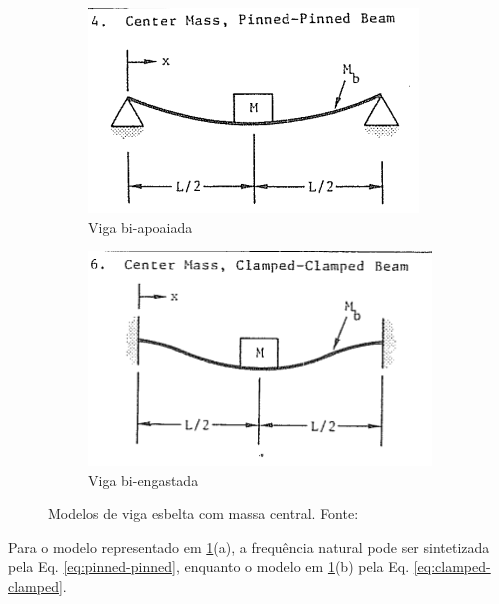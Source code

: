 \begin{figure}[h]
    \centering
    \begin{subfigure}{0.45\textwidth}
         \includegraphics[width=\textwidth]{images/frequencia/center-mass-pinned-pinned.png}
         \caption{Viga bi-apoaiada}
    \end{subfigure}
    \begin{subfigure}{0.45\textwidth}
         \includegraphics[width=\textwidth]{images/frequencia/center-mass-clamped-clamped.png}
         \caption{Viga bi-engastada}
    \end{subfigure}
    \caption{Modelos de viga esbelta com massa central. Fonte: \cite{blevins2001formulas}}
    \label{fig:blevins-models}
\end{figure}

Para o modelo representado em \ref{fig:blevins-models}(a), a frequência natural pode ser sintetizada pela Eq. \ref{eq:pinned-pinned}, enquanto o modelo em \ref{fig:blevins-models}(b) pela Eq. \ref{eq:clamped-clamped}.

